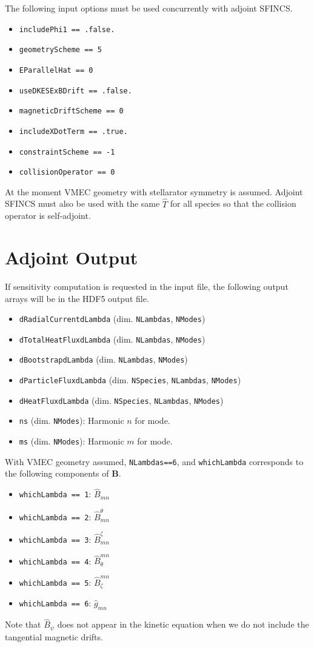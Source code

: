 \documentclass[11pt]{amsart}
\begin{document}
The following input options must be used concurrently with adjoint SFINCS.
\begin{itemize}
\item \texttt{includePhi1 == .false.} 
\item \texttt{geometryScheme == 5} 
\item \texttt{EParallelHat == 0}
\item \texttt{useDKESExBDrift == .false.}
\item \texttt{magneticDriftScheme == 0}
\item \texttt{includeXDotTerm == .true.}
\item \texttt{constraintScheme == -1}
\item \texttt{collisionOperator == 0}
\end{itemize}
At the moment VMEC geometry with stellarator symmetry is assumed. Adjoint SFINCS must also be used with the same $\hat{T}$ for all species so that the collision operator is self-adjoint. 

\section{Adjoint Output}
If sensitivity computation is requested in the input file, the following output arrays will be in the HDF5 output file.
\begin{itemize}
\item \texttt{dRadialCurrentdLambda} (dim. \texttt{NLambdas}, \texttt{NModes})
\item \texttt{dTotalHeatFluxdLambda} (dim. \texttt{NLambdas}, \texttt{NModes})
\item \texttt{dBootstrapdLambda} (dim. \texttt{NLambdas}, \texttt{NModes})
\item \texttt{dParticleFluxdLambda} (dim. \texttt{NSpecies}, \texttt{NLambdas}, \texttt{NModes})
\item \texttt{dHeatFluxdLambda} (dim. \texttt{NSpecies}, \texttt{NLambdas}, \texttt{NModes})
\item \texttt{ns} (dim. \texttt{NModes}): Harmonic $n$ for mode.
\item \texttt{ms} (dim. \texttt{NModes}): Harmonic $m$ for mode. 
\end{itemize}
With VMEC geometry assumed, \texttt{NLambdas==6}, and \texttt{whichLambda} corresponds to the following components of $\bm{B}$.
\begin{itemize}
\item \texttt{whichLambda == 1}: $\hat{B}_{mn}$
\item \texttt{whichLambda == 2}: $\hat{B}^{\theta}_{mn}$ 
\item \texttt{whichLambda == 3}: $\hat{B}^{\zeta}_{mn}$
\item \texttt{whichLambda == 4}: $\hat{B}_{\theta}^{mn}$
\item \texttt{whichLambda == 5}: $\hat{B}_{\zeta}^{mn}$
\item \texttt{whichLambda == 6}: $\hat{g}_{mn}$
\end{itemize}
Note that $\hat{B}_{\psi}$ does not appear in the kinetic equation when we do not include the tangential magnetic drifts. 
\end{document}
